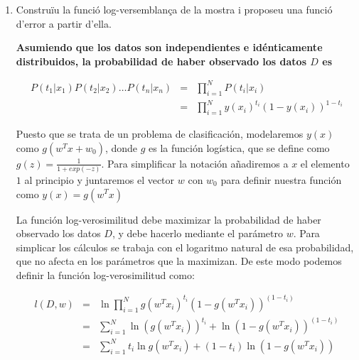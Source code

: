 \documentclass[a4paper]{article}
\begin{document}
\begin{enumerate}
 \item Construïu la funció log-versemblança de la mostra i proposeu una funció d'error a partir d'ella.

       {\bfseries
       Asumiendo que los datos son independientes e idénticamente distribuidos, la probabilidad de haber observado los datos $D$ es

       \begin{eqnarray*}
        P(t_1 | x_1 )P(t_2 | x_2 )\dots P(t_n | x_n ) &=& \prod_{i = 1}^{N} P(t_i | x_i ) \\
        &=& \prod_{i = 1}^{N} y(x_i)^{t_i} (1 - y(x_i))^{1-t_i}
       \end{eqnarray*}

       Puesto que se trata de un problema de clasificación, modelaremos $y(x)$ como $g(w^Tx + w_0)$, donde $g$ es la función logística, que se define como $g(z) = \frac{1}{1 + exp(-z)}$. Para simplificar la notación añadiremos a $x$ el elemento $1$ al principio y juntaremos el vector $w$ con $w_0$ para definir nuestra función como $y(x) = g(w^Tx)$


       La función log-verosimilitud debe maximizar la probabilidad de haber observado los datos $D$, y debe hacerlo mediante el parámetro $w$. Para simplicar los cálculos se trabaja con el logaritmo natural de esa probabilidad, que no afecta en los parámetros que la maximizan. De este modo podemos definir la función log-verosimilitud como:


       \begin{eqnarray*}
        l(D, w)
        &=& \ln
        \prod_{i = 1}^{N}
        g(w^Tx_i)^{t_i}
        (1 - g(w^Tx_i))^{(1 - t_i)} \\
        &=&
        \sum_{i = 1}^{N} \ln(g(w^Tx_i))^{t_i} + \ln (1 - g(w^Tx_i))^{(1 - t_i)} \\
        &=&
        \sum_{i = 1}^{N}
        t_i\ln g(w^Tx_i) + (1-t_i)\ln(1-g(w^Tx_i))
       \end{eqnarray*}

}
\end{enumerate}
\end{document}
